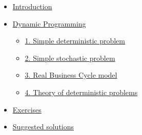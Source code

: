 \usepackage{hyperref}
\begin{itemize}
\item \href{cover.tex}{Introduction}
\item \href{intro.tex}{Dynamic Programming}
  \begin{itemize}
  \item \href{deterministic.tex}{1. Simple deterministic problem}
  \item \href{stochastic.tex}{2. Simple stochastic problem}
  \item \href{business-cycle.tex}{3. Real Business Cycle model}
  \item \href{theory.tex}{4. Theory of deterministic problems}
  \end{itemize}
\item \href{ps1.tex}{Exercises}
\item \href{solutions.tex}{Suggested solutions}
\end{itemize}
